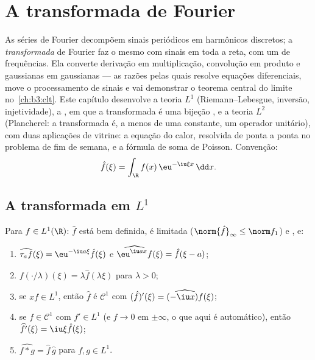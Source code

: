 \chapter{A transformada de Fourier}\label{ch:b3:fouriertransform}

As séries de Fourier decompõem sinais periódicos em harmônicos
discretos; a \emph{transformada} de Fourier faz o mesmo com sinais em
toda a reta, com um  de frequências. Ela converte derivação em
multiplicação, convolução em produto e gaussianas em gaussianas --- as
razões pelas quais resolve equações diferenciais, move o processamento
de sinais e vai demonstrar o teorema central do limite no~\cref{ch:b3:clt}. Este capítulo desenvolve a teoria $L^1$
(Riemann--Lebesgue, inversão, injetividade), a , em
que a transformada é uma bijeção , e a teoria $L^2$
(Plancherel: a transformada é, a menos de uma constante, um operador
unitário), com duas aplicações de vitrine: a equação do calor, resolvida
de ponta a ponta no problema de fim de semana, e a fórmula de soma de
Poisson. Convenção:
\[
\hat f(\xi) = \int_\R f(x)\,\eu^{-\iu\xi x}\,\dd x .
\]

\section{A transformada em \texorpdfstring{$L^1$}{L1}}

\begin{proposition}\label{prop:b3:fouriertransform:basic}
Para $f \in L^1(\R)$: $\hat f$ está bem definida, é limitada ($\norm{\hat f}_\infty \leq \norm f_1$) e , e:
\begin{enumerate}
  \item $\widehat{\tau_af}(\xi) = \eu^{-\iu a\xi}\hat f(\xi)$ e $\widehat{\eu^{\iu ax}f}(\xi) = \hat f(\xi - a)$;
  \item $\widehat{f(\cdot/\lambda)}(\xi) = \lambda\hat
        f(\lambda\xi)$ para $\lambda > 0$;
  \item se $xf \in L^1$, então $\hat f$ é $\mathcal C^1$ com $(\hat f)'(\xi) = \widehat{(-\iu x)f}(\xi)$;
  \item se $f \in \mathcal C^1$ com $f' \in L^1$ (e $f \to
        0$ em $\pm\infty$, o que aqui é automático),
        então $\widehat{f'}(\xi) = \iu\xi\hat f(\xi)$;
  \item $\widehat{f * g} = \hat f\,\hat g$ para $f, g \in L^1$.
\end{enumerate}
\end{proposition}

